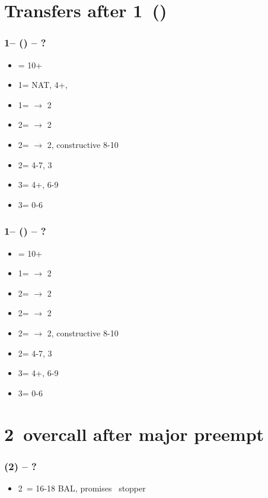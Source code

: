 \section{\texorpdfstring{Transfers after 1\majs\ (\dbl)}{Transfers1MX}}\label{sec:Transfers1MX}

\subsubsection*{1\hearts -- (\dbl) -- ?}
\begin{itemize}
    \item \rdbl = 10+
    \item 1\spades = NAT, 4+\spades, \fonce
    \item 1\nt = $\rightarrow$ 2\clubs
    \item 2\clubs = $\rightarrow$ 2\diams
    \item 2\diams = $\rightarrow$ 2\hearts, constructive 8-10
    \item 2\hearts = 4-7, 3\hearts
    \item 3\diams = 4+\hearts, 6-9
    \item 3\hearts = 0-6 \hcp
\end{itemize}

\subsubsection*{1\spades -- (\dbl) -- ?}
\begin{itemize}
    \item \rdbl = 10+
    \item 1\nt = $\rightarrow$ 2\clubs
    \item 2\clubs = $\rightarrow$ 2\diams
    \item 2\diams = $\rightarrow$ 2\hearts
    \item 2\hearts = $\rightarrow$ 2\spades, constructive 8-10
    \item 2\spades = 4-7, 3\spades
    \item 3\hearts = 4+\spades, 6-9
    \item 3\spades = 0-6 \hcp
\end{itemize}

\section{\texorpdfstring{2\ntx\ overcall after major preempt}{preempt2nt}}\label{sec:preempt2nt}

\subsubsection*{(2\majs) -- ?}
\begin{itemize}
    \item 2\nt\ = 16-18 BAL, promises \majs\ stopper
\end{itemize}

